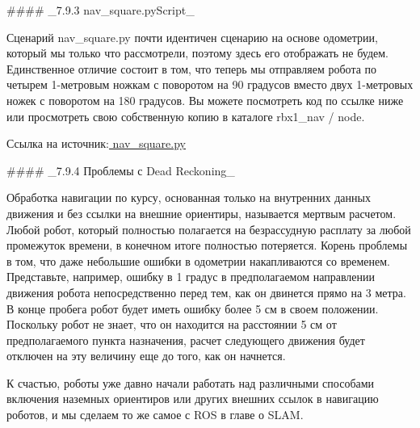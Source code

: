 #### _7.9.3 nav\_square.pyScript_

Сценарий nav\_square.py почти идентичен сценарию на основе одометрии, который мы только что рассмотрели, поэтому здесь его отображать не будем. Единственное отличие состоит в том, что теперь мы отправляем робота по четырем 1-метровым ножкам с поворотом на 90 градусов вместо двух 1-метровых ножек с поворотом на 180 градусов. Вы можете посмотреть код по ссылке ниже или просмотреть свою собственную копию в каталоге rbx1\_nav / node.

Ссылка на источник:\href{https://github.com/pirobot/rbx1/blob/indigo-devel/rbx1_nav/nodes/nav_square.py}{ nav\_square.py}

#### _7.9.4 Проблемы с Dead Reckoning_

Обработка навигации по курсу, основанная только на внутренних данных движения и без ссылки на внешние ориентиры, называется мертвым расчетом. Любой робот, который полностью полагается на безрассудную расплату за любой промежуток времени, в конечном итоге полностью потеряется. Корень проблемы в том, что даже небольшие ошибки в одометрии накапливаются со временем. Представьте, например, ошибку в 1 градус в предполагаемом направлении движения робота непосредственно перед тем, как он двинется прямо на 3 метра. В конце пробега робот будет иметь ошибку более 5 см в своем положении. Поскольку робот не знает, что он находится на расстоянии 5 см от предполагаемого пункта назначения, расчет следующего движения будет отключен на эту величину еще до того, как он начнется.

К счастью, роботы уже давно начали работать над различными способами включения наземных ориентиров или других внешних ссылок в навигацию роботов, и мы сделаем то же самое с ROS в главе о SLAM.

